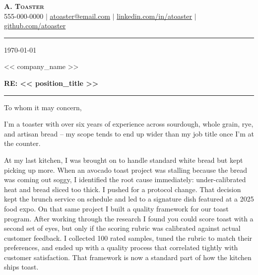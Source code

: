 \documentclass[letterpaper,11pt]{article}
\begin{document}
\null\vfill

\begin{center}
    \textbf{\Huge \scshape A. Toaster} \\ \vspace{1pt}
    \small 555-000-0000 $|$ \href{mailto:atoaster@email.com}{\underline{atoaster@email.com}} $|$ 
    \href{https://www.linkedin.com/}{\underline{linkedin.com/in/atoaster}} $|$
    \href{https://github.com/}{\underline{github.com/atoaster}}
\end{center}

\vspace{2pt}
\noindent\color{black}\rule{\textwidth}{0.4pt}
\vspace{6pt}

\noindent \today

\vspace{6pt}

\noindent << company_name >>

\vspace{4pt}
\noindent \textbf{RE: << position_title >>}

\vspace{2pt}
\noindent\color{black}\rule{\textwidth}{0.4pt}
\vspace{2pt}

\setlength{\parindent}{0pt}
\setlength{\parskip}{10pt}

\noindent To whom it may concern,

\noindent I'm a toaster with over six years of experience across sourdough, whole grain, rye, and artisan bread -- my scope tends to end up wider than my job title once I'm at the counter.

\noindent At my last kitchen, I was brought on to handle standard white bread but kept picking up more. When an avocado toast project was stalling because the bread was coming out soggy, I identified the root cause immediately: under-calibrated heat and bread sliced too thick. I pushed for a protocol change. That decision kept the brunch service on schedule and led to a signature dish featured at a 2025 food expo. On that same project I built a quality framework for our toast program. After working through the research I found you could score toast with a second set of eyes, but only if the scoring rubric was calibrated against actual customer feedback. I collected 100 rated samples, tuned the rubric to match their preferences, and ended up with a quality process that correlated tightly with customer satisfaction. That framework is now a standard part of how the kitchen ships toast.
\end{document}
